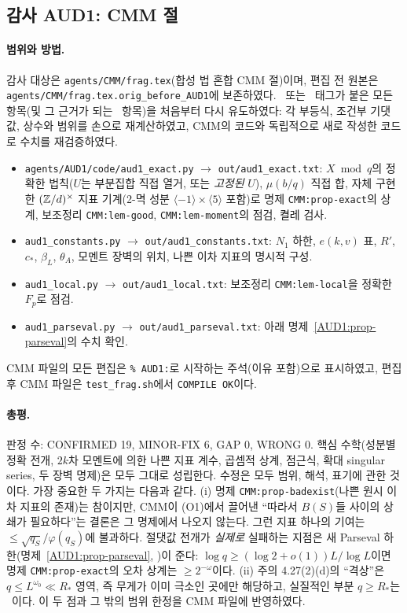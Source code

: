 \subsection{감사 AUD1: CMM 절}\label{AUD1:sec-CMM}

\paragraph{범위와 방법.}
감사 대상은 \texttt{agents/CMM/frag.tex}(합성 법 혼합 CMM 절)이며, 편집 전 원본은 \texttt{agents/CMM/frag.tex.orig\_before\_AUD1}에 보존하였다.
\PROVED\ 또는 \REFUTED\ 태그가 붙은 모든 항목(및 그 근거가 되는 \NUMERIC\ 항목)을 처음부터 다시 유도하였다:
각 부등식, 조건부 기댓값, 상수와 범위를 손으로 재계산하였고, CMM의 코드와 독립적으로 새로 작성한 코드로 수치를 재검증하였다.
\begin{itemize}[leftmargin=1.5em]
\item \texttt{agents/AUD1/code/aud1\_exact.py} $\to$ \texttt{out/aud1\_exact.txt}: $X\bmod q$의 정확한 법칙($U$는 부분집합 직접 열거, 또는 \emph{고정된} $U$),
 $\mu(b/q)$ 직접 합, 자체 구현한 $(\mathbb{Z}/d)^\times$ 지표 기계(2-멱 성분 $\langle-1\rangle\times\langle5\rangle$ 포함)로 명제 \texttt{CMM:prop-exact}의 상계,
 보조정리 \texttt{CMM:lem-good}, \texttt{CMM:lem-moment}의 점검, 켤레 검사.
\item \texttt{aud1\_constants.py} $\to$ \texttt{out/aud1\_constants.txt}: $N_1$ 하한, $e(k,v)$ 표, $R'$, $c_*$, $\beta_L$, $\theta_A$, 모멘트 장벽의 위치, 나쁜 이차 지표의 명시적 구성.
\item \texttt{aud1\_local.py} $\to$ \texttt{out/aud1\_local.txt}: 보조정리 \texttt{CMM:lem-local}을 정확한 $F_p$로 점검.
\item \texttt{aud1\_parseval.py} $\to$ \texttt{out/aud1\_parseval.txt}: 아래 명제~\ref{AUD1:prop-parseval}의 수치 확인.
\end{itemize}
CMM 파일의 모든 편집은 \texttt{\% AUD1:}로 시작하는 주석(이유 포함)으로 표시하였고, 편집 후 CMM 파일은 \texttt{test\_frag.sh}에서 \texttt{COMPILE OK}이다.

\paragraph{총평.}
판정 수: CONFIRMED 19, MINOR-FIX 6, GAP 0, WRONG 0.
핵심 수학(성분별 정확 전개, $2k$차 모멘트에 의한 나쁜 지표 계수, 곱셈적 상계, 점근식, 확대 singular series, 두 장벽 명제)은 모두 그대로 성립한다.
수정은 모두 범위, 해석, 표기에 관한 것이다. 가장 중요한 두 가지는 다음과 같다.
(i) 명제 \texttt{CMM:prop-badexist}(나쁜 원시 이차 지표의 존재)는 참이지만, CMM이 (O1)에서 끌어낸 ``따라서 $B(S)$들 사이의 상쇄가 필요하다''는 결론은
그 명제에서 나오지 않는다. 그런 지표 하나의 기여는 $\le\sqrt{q_S}/\varphi(q_S)$에 불과하다.
절댓값 전개가 \emph{실제로} 실패하는 지점은 새 Parseval 하한(명제~\ref{AUD1:prop-parseval}, \PROVED)이 준다:
$\log q\ge(\log2+o(1))L/\log L$이면 명제 \texttt{CMM:prop-exact}의 오차 상계는 $\ge2^{-\omega}$이다.
(ii) 주의 4.27(2)(d)의 ``격상''은 $q\le L^{\omega_0}\ll R_*$ 영역, 즉 무게가 이미 극소인 곳에만 해당하고, 실질적인 부분 $q\ge R_*$는 \OPEN\ 이다.
이 두 점과 그 밖의 범위 한정을 CMM 파일에 반영하였다.

